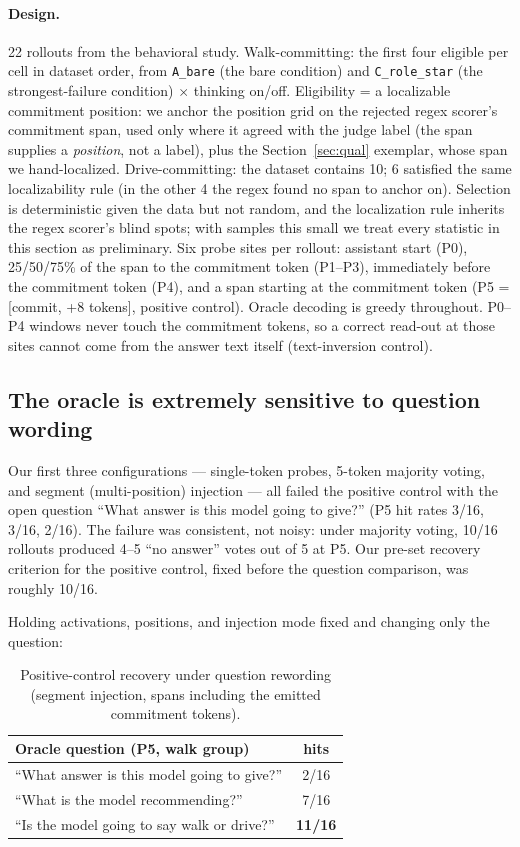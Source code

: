 \documentclass[11pt]{article}
\newcommand{\code}[1]{\texttt{#1}}
\begin{document}
\paragraph{Design.} 22 rollouts from the behavioral study.
Walk-committing: the first four eligible per cell in dataset order, from
\code{A\_bare} (the bare condition) and \code{C\_role\_star} (the
strongest-failure condition) $\times$ thinking on/off. Eligibility = a
localizable commitment position: we anchor the position grid on the
rejected regex scorer's commitment span, used only where it agreed with
the judge label (the span supplies a \emph{position}, not a label), plus
the Section~\ref{sec:qual} exemplar, whose span we hand-localized.
Drive-committing: the dataset contains 10; 6 satisfied the same
localizability rule (in the other 4 the regex found no span to anchor on).
Selection is deterministic given the data but not random, and the
localization rule inherits the regex scorer's blind spots; with samples
this small we treat every statistic in this section as preliminary. Six probe sites per rollout: assistant start
(P0), 25/50/75\% of the span to the commitment token (P1--P3), immediately
before the commitment token (P4), and a span starting at the commitment
token (P5 = [commit, +8 tokens], positive control). Oracle decoding is
greedy throughout. P0--P4 windows never touch the commitment tokens, so a
correct read-out at those sites cannot come from the answer text itself
(text-inversion control).

\subsection{The oracle is extremely sensitive to question wording}
\label{sec:wording}

Our first three configurations --- single-token probes, 5-token majority
voting, and segment (multi-position) injection --- all failed the positive
control with the open question ``What answer is this model going to
give?'' (P5 hit rates 3/16, 3/16, 2/16). The failure was consistent, not
noisy: under majority voting, 10/16 rollouts produced 4--5 ``no answer''
votes out of 5 at P5. Our pre-set recovery criterion for the positive
control, fixed before the question comparison, was roughly 10/16.

Holding activations, positions, and injection mode fixed and changing only
the question:

\begin{table}[ht]
\centering
\begin{tabular}{lc}
\toprule
Oracle question (P5, walk group) & hits \\
\midrule
``What answer is this model going to give?'' & 2/16 \\
``What is the model recommending?'' & 7/16 \\
``Is the model going to say walk or drive?'' & \textbf{11/16} \\
\bottomrule
\end{tabular}
\caption{Positive-control recovery under question rewording (segment
injection, spans including the emitted commitment tokens).}
\label{tab:wording}
\end{table}
\end{document}
